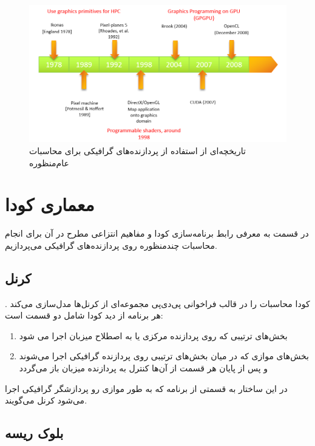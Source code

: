 \documentclass{thesis}
\begin{document}
\begin{figure}[h]
\centering
\includegraphics[width=\textwidth]{./pics/8}
\caption{
تاریخچه‌ای از استفاده از پردازنده‌های گرافیکی برای محاسبات عام‌منظوره
}
\end{figure}

\section{
معماری کودا
}

در قسمت به معرفی رابط برنامه‌سازی کودا و مفاهیم انتزاعی مطرح در آن برای انجام محاسبات چند‌منظوره روی پردازنده‌های گرافیکی می‌پردازیم.

\subsection{
کرنل
}

کودا محاسبات را در قالب فراخوانی پی‌دی‌پی مجموعه‌ای از کرنل‌ها
 مدل‌سازی می‌کند
.
هر برنامه از دید کودا شامل دو قسمت است:

\begin{enumerate}
\item 
 بخش‌های ترتیبی که روی پردازنده مرکزی یا به اصطلاح میزبان
اجرا می شود
\item
بخش‌های موازی که در میان بخش‌های ترتیبی روی پردازنده گرافیکی اجرا می‌شوند و پس از پایان هر قسمت از آن‌ها کنترل به پردازنده میزبان باز می‌گردد
\end{enumerate}

در این ساختار
به قسمتی از برنامه که به طور موازی رو پردازشگر گرافیکی اجرا می‌شود
کرنل می‌گویند.


\subsection{بلوک ریسه}
\end{document}
